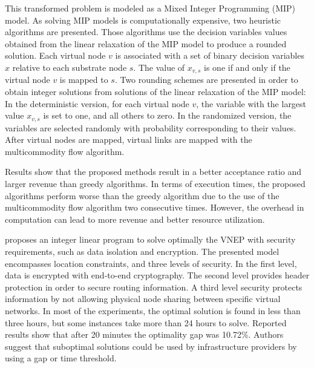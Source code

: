This transformed problem is modeled as a Mixed Integer Programming (MIP) model. As solving MIP models is computationally expensive, two heuristic algorithms are presented. Those algorithms use the decision variables values obtained from the linear relaxation of the MIP model to produce a rounded solution. Each virtual node $v$ is associated with a set of binary decision variables $x$ relative to each substrate node $s$. The value of $x_{v,s}$ is one if and only if the virtual node $v$ is mapped to $s$. Two rounding schemes are presented in order to obtain integer solutions from solutions of the linear relaxation of the MIP model: In the deterministic version, for each virtual node $v$, the variable with the largest value $x_{v,s}$ is set to one, and all others to zero. In the randomized version, the variables are selected randomly with probability corresponding to their values. After virtual nodes are mapped, virtual links are mapped with the multicommodity flow algorithm.


Results show that the proposed methods result in a better acceptance ratio and larger revenue than greedy algorithms. In terms of execution times, the proposed algorithms perform worse than the greedy algorithm due to the use of the multicommodity flow algorithm two consecutive times. However, the overhead in computation can lead to more revenue and better resource utilization.



\citet{Buriol:2012} proposes an integer linear program to solve optimally the VNEP with security requirements, such as data isolation and encryption.
The presented model encompasses location constraints, and three levels of security.
In the first level, data is encrypted with end-to-end cryptography.
The second level provides header protection in order to secure routing information.
A third level security protects information by not allowing physical node sharing between specific virtual networks.
In most of the experiments, the optimal solution is found in less than three hours, but some instances take more than 24 hours to solve. 
Reported results show that after 20 minutes the optimality gap was 10.72\%.
Authors suggest that suboptimal solutions could be used by infrastructure providers by using a gap or time threshold.




